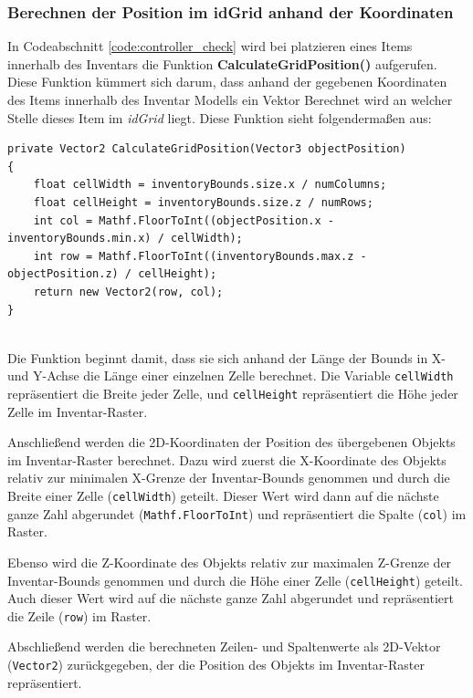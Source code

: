 \subsubsection{Berechnen der Position im idGrid anhand der Koordinaten}
In Codeabschnitt \ref{code:controller_check} wird bei platzieren eines Items innerhalb des Inventars die Funktion
\textbf{CalculateGridPosition()} aufgerufen. Diese Funktion kümmert sich darum, dass anhand der gegebenen Koordinaten des
Items innerhalb des Inventar Modells ein Vektor Berechnet wird an welcher Stelle dieses Item im \textit{idGrid} liegt.
Diese Funktion sieht folgendermaßen aus:
\begin{lstlisting}[style=csharp, caption={Stelle im idGrid anhand Koordinaten berechnen}, label=code:controller_calcPos]
private Vector2 CalculateGridPosition(Vector3 objectPosition)
{
    float cellWidth = inventoryBounds.size.x / numColumns;
    float cellHeight = inventoryBounds.size.z / numRows;
    int col = Mathf.FloorToInt((objectPosition.x - inventoryBounds.min.x) / cellWidth);
    int row = Mathf.FloorToInt((inventoryBounds.max.z - objectPosition.z) / cellHeight);
    return new Vector2(row, col);
}
\end{lstlisting}\\
Die Funktion beginnt damit, dass sie sich anhand der Länge der Bounds in X- und Y-Achse die Länge einer einzelnen Zelle
berechnet. Die Variable \texttt{cellWidth} repräsentiert die Breite jeder Zelle, und \texttt{cellHeight} repräsentiert
die Höhe jeder Zelle im Inventar-Raster.

Anschließend werden die 2D-Koordinaten der Position des übergebenen Objekts im Inventar-Raster berechnet. Dazu wird
zuerst die X-Koordinate des Objekts relativ zur minimalen X-Grenze der Inventar-Bounds genommen und durch die Breite
einer Zelle (\texttt{cellWidth}) geteilt. Dieser Wert wird dann auf die nächste ganze Zahl abgerundet
(\texttt{Mathf.FloorToInt}) und repräsentiert die Spalte (\texttt{col}) im Raster.

Ebenso wird die Z-Koordinate des Objekts relativ zur maximalen Z-Grenze der Inventar-Bounds genommen und durch die Höhe
einer Zelle (\texttt{cellHeight}) geteilt. Auch dieser Wert wird auf die nächste ganze Zahl abgerundet und repräsentiert
die Zeile (\texttt{row}) im Raster.

Abschließend werden die berechneten Zeilen- und Spaltenwerte als 2D-Vektor (\texttt{Vector2}) zurückgegeben, der die
Position des Objekts im Inventar-Raster repräsentiert.

